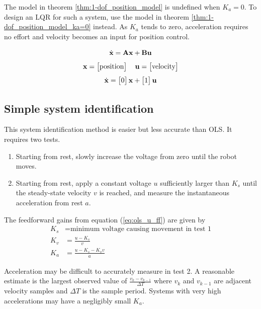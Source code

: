 The model in theorem \ref{thm:1-dof_position_model} is undefined when $K_a = 0$.
To design an LQR for such a system, use the model in theorem
\ref{thm:1-dof_position_model_ka=0} instead. As $K_a$ tends to zero,
acceleration requires no effort and velocity becomes an input for position
control.
\begin{theorem}[1-DOF mechanism position model ($K_a = 0$)]
  \label{thm:1-dof_position_model_ka=0}
  \begin{equation*}
    \dot{\mathbf{x}} = \mathbf{A}\mathbf{x} + \mathbf{B}\mathbf{u}
  \end{equation*}
  \begin{equation*}
    \mathbf{x} =
    \begin{bmatrix}
      \text{position}
    \end{bmatrix}
    \quad
    \mathbf{u} =
    \begin{bmatrix}
      \text{velocity}
    \end{bmatrix}
  \end{equation*}
  \begin{equation}
    \dot{\mathbf{x}} =
    \begin{bmatrix}
      0
    \end{bmatrix}
    \mathbf{x} +
    \begin{bmatrix}
      1
    \end{bmatrix}
    \mathbf{u}
  \end{equation}
\end{theorem}

\subsection{Simple system identification}

This system identification method is easier but less accurate than OLS. It
requires two tests.
\begin{enumerate}
  \item Starting from rest, slowly increase the voltage from zero until the
    robot moves.
  \item Starting from rest, apply a constant voltage $u$ sufficiently larger
    than $K_s$ until the steady-state velocity $v$ is reached, and measure the
    instantaneous acceleration from rest $a$.
\end{enumerate}

The feedforward gains from equation (\ref{eq:ols_u_ff}) are given by
\begin{align*}
  K_s &= \text{minimum voltage causing movement in test 1} \\
  K_v &= \frac{u - K_s}{v} \\
  K_a &= \frac{u - K_s - K_v v}{a}
\end{align*}

Acceleration may be difficult to accurately measure in test 2. A reasonable
estimate is the largest observed value of $\frac{v_k - v_{k-1}}{\Delta T}$ where
$v_k$ and $v_{k-1}$ are adjacent velocity samples and $\Delta T$ is the sample
period. Systems with very high accelerations may have a negligibly small $K_a$.
